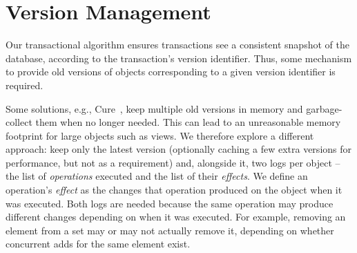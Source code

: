 \section{Version Management}
\label{sec:version_management}

Our transactional algorithm ensures transactions see a consistent snapshot of the database, according to the transaction's version identifier.
Thus, some mechanism to provide old versions of objects corresponding to a given version identifier is required.



Some solutions, e.g., Cure~\cite{cure}, keep multiple old versions in memory and garbage-collect them when no longer needed.
This can lead to an unreasonable memory footprint for large objects such as views.
We therefore explore a different approach: keep only the latest version (optionally caching a few extra versions for performance, but not as a requirement) and, alongside it, two logs per object -- the list of \emph{operations} executed and the list of their \emph{effects}.
We define an operation's \emph{effect} as the changes that operation produced on the object when it was executed.
Both logs are needed because the same operation may produce different changes depending on when it was executed.
For example, removing an element from a set may or may not actually remove it, depending on whether concurrent adds for the same element exist.

